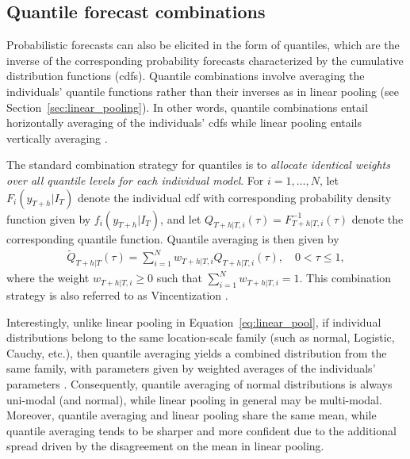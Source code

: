 \documentclass[a4paper,11pt]{article}
\begin{document}
\subsection{Quantile forecast combinations}
\label{sec:quantile_comb}

Probabilistic forecasts can also be elicited in the form of quantiles, which are the inverse of the corresponding probability forecasts characterized by the cumulative distribution functions (cdfs). Quantile combinations involve averaging the individuals' quantile functions rather than their inverses as in linear pooling (see Section~\ref{sec:linear_pooling}). In other words, quantile combinations entail horizontally averaging of the individuals' cdfs while linear pooling entails vertically averaging \citep{Lichtendahl2013-rt}.

The standard combination strategy for quantiles is to \textit{allocate identical weights over all quantile levels for each individual model}. For $i=1,\dots,N$, let $F_{i}(y_{T+h}|I_{T})$ denote the individual cdf with corresponding probability density function given by $f_{i}(y_{T+h}|I_{T})$, and let $Q_{T+h|T,i}(\tau) = F_{T+h|T,i}^{-1}(\tau)$ denote the corresponding quantile function. Quantile averaging is then given by
\begin{align}
  \label{eq:quantile_avg}
  \tilde{Q}_{T+h|T}(\tau) = \sum_{i=1}^{N} w_{T+h|T,i} Q_{T+h|T,i}(\tau), \quad 0 < \tau \leq 1,
\end{align}
where the weight $w_{T+h|T,i}\ge0$ such that $\sum_{i=1}^{N}w_{T+h|T,i}=1$. This combination strategy is also referred to as Vincentization \citep{vincent1912-fu}.

Interestingly, unlike linear pooling in Equation~\eqref{eq:linear_pool}, if individual distributions belong to the same location-scale family (such as normal, Logistic, Cauchy, etc.), then quantile averaging yields a combined distribution from the same family, with parameters given by weighted averages of the individuals' parameters \citep{Ratcliff1979-cb,Thomas1980-lp}. Consequently, quantile averaging of normal distributions is always uni-modal (and normal), while linear pooling in general may be multi-modal. Moreover, quantile averaging and linear pooling share the same mean, while quantile averaging tends to be sharper and more confident due to the additional spread driven by the disagreement on the mean in linear pooling.
\end{document}
